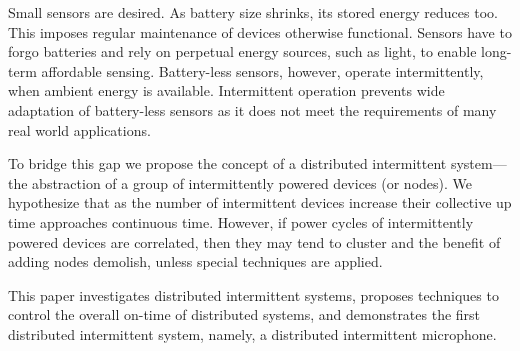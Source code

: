 %
Small sensors are desired. As battery size shrinks, its stored energy reduces too. This imposes regular maintenance of devices otherwise functional. Sensors have to forgo batteries and rely on perpetual energy sources, such as light, to enable long-term affordable sensing. Battery-less sensors, however, operate intermittently, when ambient energy is available. Intermittent operation prevents wide adaptation of battery-less sensors as it does not meet the requirements of many real world applications. 

To bridge this gap we propose the concept of a distributed intermittent system---the abstraction of a group of intermittently powered devices (or nodes). We hypothesize that as the number of intermittent devices increase their collective up time approaches continuous time. However, if power cycles of intermittently powered devices are correlated, then they may tend to cluster and the benefit of adding nodes demolish, unless special techniques are applied. 


This paper investigates distributed intermittent systems, proposes techniques to control the overall on-time of distributed systems, and demonstrates the first distributed intermittent system, namely, a distributed intermittent microphone. 


